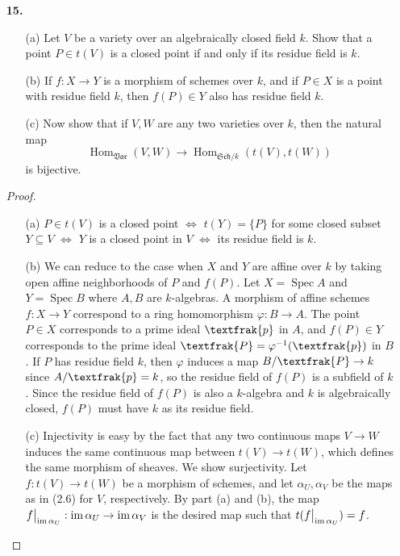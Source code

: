 \documentclass{article}
\newcommand{\goth}[1]{\textfrak{#1}}
\DeclareMathOperator{\im}{im}
\DeclareMathOperator{\Hom}{Hom}
\DeclareMathOperator{\spec}{Spec}
\newcommand\restr[2]{{%
  \left.\kern-\nulldelimiterspace %
  #1 %
  \vphantom{\big|} %
  \right|_{#2} %
}}
\begin{document}
\begin{enumerate} [label=\textbf{\arabic*.}, leftmargin=0em]
\item[\textbf{15.}] \begin{itemize}
    \item[(a)] Let $V$ be a variety over an algebraically closed field $k$. Show that a point $P \in t(V)$ is a closed point if and only if its residue field is $k$.
    \item[(b)] If $f : X \to Y$ is a morphism of schemes over $k$, and if $P \in X$ is a point with residue field $k$, then $f(P) \in Y$ also has residue field $k$.
    \item[(c)] Now show that if $V, W$ are any two varieties over $k$, then the natural map
    \begin{equation*}
        \Hom_{\mathfrak{Var}}(V, W) \to \Hom_{\mathfrak{Sch}/k}(t(V), t(W))
    \end{equation*}
    is bijective.
\end{itemize}

\begin{proof} $ $ \vspace{0pt}
    \begin{itemize} [leftmargin=0cm]
        \item[(a)] $P \in t(V)$ is a closed point $\iff$ $t(Y) = \{ P \}$ for some closed subset $Y \subseteq V$ $\iff$ $Y$ is a closed point in $V$ $\iff$ its residue field is $k$.

        \item[(b)] We can reduce to the case when $X$ and $Y$ are affine over $k$ by taking open affine neighborhoods of $P$ and $f(P)$. Let $X = \spec{A}$ and $Y = \spec{B}$ where $A, B$ are $k$-algebras. A morphism of affine schemes $f : X \to Y$ correspond to a ring homomorphism $\varphi : B \to A$. The point $P \in X$ corresponds to a prime ideal $\goth{p}$ in $A$, and $f(P) \in Y$ corresponds to the prime ideal $\goth{P} = \varphi^{-1}(\goth{p})$ in $B$. If $P$ has residue field $k$, then $\varphi$ induces a map $B / \goth{P} \to  k$ since $A / \goth{p} = k$, so the residue field of $f(P)$ is a subfield of $k$. Since the residue field of $f(P)$ is also a $k$-algebra and $k$ is algebraically closed, $f(P)$ must have $k$ as its residue field.

        \item[(c)] Injectivity is easy by the fact that any two continuous maps $V \to W$ induces the same continuous map between $t(V) \to t(W)$, which defines the same morphism of sheaves. We show surjectivity. Let $f : t(V) \to t(W)$ be a morphism of schemes, and let $\alpha_{U}, \alpha_V$ be the maps as in (2.6) for $V$, respectively. By part (a) and (b), the map $\restr{f}{\im{\alpha_U}} : \im{\alpha_U} \to \im{\alpha_V}$ is the desired map such that $t(\restr{f}{\im{\alpha_U}}) = f$.
    \end{itemize}
\end{proof}


\end{enumerate}
\end{document}
